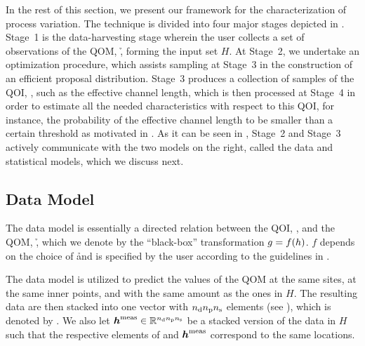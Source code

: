 In the rest of this section, we present our framework for the characterization
of process variation. The technique is divided into four major stages depicted
in . Stage~1 is the data-harvesting stage wherein the user
collects a set of observations of the \ac{QOM}, \h, forming the input set $H$.
At Stage~2, we undertake an optimization procedure, which assists 
sampling at Stage~3 in the construction of an efficient proposal distribution.
Stage~3 produces a collection of samples of the \ac{QOI}, \g, such as the
effective channel length, which is then processed at Stage~4 in order to
estimate all the needed characteristics with respect to this \ac{QOI}, for
instance, the probability of the effective channel length to be smaller than a
certain threshold as motivated in . As it can be seen in
, Stage~2 and Stage~3 actively communicate with the two models
on the right, called the data and statistical models, which we discuss next.

\subsection{Data Model}

The data model is essentially a directed relation between the \ac{QOI}, \g, and
the \ac{QOM}, \h, which we denote by the ``black-box'' transformation $g =
f(h)$. $f$ depends on the choice of \h and is specified by the user according
to the guidelines in .

The data model is utilized to predict the values of the \ac{QOM} at the same
sites, at the same inner points, and with the same amount as the ones in $H$.
The resulting data are then stacked into one vector with ${n_\mathrm{d}} {n_\mathrm{p}} {n_\mathrm{s}}$ elements
(see ), which is denoted by \vh. We also let
$\boldsymbol{h}^{\mathrm{meas}} \in \mathbb{R}^{{n_\mathrm{d}} {n_\mathrm{p}} {n_\mathrm{s}}}$ be a stacked version of the data in $H$
such that the respective elements of \vh and $\boldsymbol{h}^{\mathrm{meas}}$ correspond to the
same locations.

